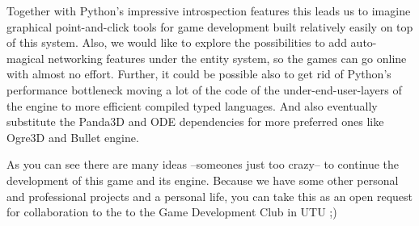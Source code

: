 \documentclass[a4paper,10pt]{article}
\begin{document}
\begin{enumerate}
  Together with Python's impressive introspection features this leads
  us to imagine graphical point-and-click tools for game development
  built relatively easily on top of this system. Also, we would like
  to explore the possibilities to add auto-magical networking features
  under the entity system, so the games can go online with almost no
  effort. Further, it could be possible also to get rid of Python's
  performance bottleneck moving a lot of the code of the
  under-end-user-layers of the engine to more efficient compiled typed
  languages. And also eventually substitute the Panda3D and ODE
  dependencies for more preferred ones like Ogre3D and Bullet engine.

\end{enumerate}

As you can see there are many ideas --someones just too crazy-- to
continue the development of this game and its engine. Because we have
some other personal and professional projects and a personal life,
you can take this as an open request for collaboration to the to the
Game Development Club in UTU ;)

{}



\end{document}
